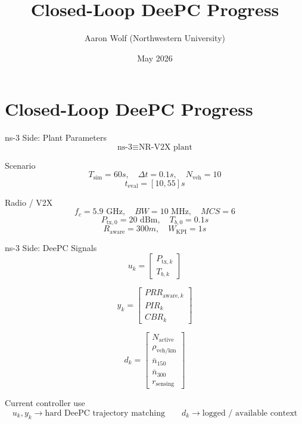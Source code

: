 \documentclass[aspectratio=1610]{beamer}
\title{Closed-Loop DeePC Progress}
\date{May 2026}
\author{Aaron Wolf (Northwestern University)}
\begin{document}
\section{Closed-Loop DeePC Progress}

\begin{frame}{ns-3 Side: Plant Parameters}
\[
\text{ns-3} \equiv \text{NR-V2X plant}
\]

\begin{block}{Scenario}
\[
T_{\mathrm{sim}}=60s,\quad \Delta t=0.1s,\quad N_{\mathrm{veh}}=10
\]
\[
t_{\mathrm{eval}}=[10,55]s
\]
\end{block}

\begin{block}{Radio / V2X}
\[
f_c=5.9\text{ GHz},\quad BW=10\text{ MHz},\quad MCS=6
\]
\[
P_{\mathrm{tx},0}=20\text{ dBm},\quad T_{b,0}=0.1s
\]
\[
R_{\mathrm{aware}}=300m,\quad W_{\mathrm{KPI}}=1s
\]
\end{block}
\end{frame}


\begin{frame}{ns-3 Side: DeePC Signals}
\[
u_k =
\begin{bmatrix}
P_{\mathrm{tx},k}\\
T_{b,k}
\end{bmatrix}
\]

\[
y_k =
\begin{bmatrix}
PRR_{\mathrm{aware},k}\\
PIR_k\\
CBR_k
\end{bmatrix}
\]

\[
d_k =
\begin{bmatrix}
N_{\mathrm{active}}\\
\rho_{\mathrm{veh/km}}\\
\bar n_{150}\\
\bar n_{300}\\
r_{\mathrm{sensing}}
\end{bmatrix}
\]

\begin{exampleblock}{Current controller use}
\[
u_k,y_k \rightarrow \text{hard DeePC trajectory matching}
\qquad
d_k \rightarrow \text{logged / available context}
\]
\end{exampleblock}
\end{frame}

\end{document}
